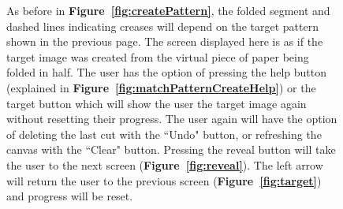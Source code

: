 \documentclass[11pt]{article}
\begin{document}
           \begin{figure}
                \begin{minipage}[c]{0.65\textwidth}
                \caption{As before in \textbf{Figure~\ref{fig:createPattern}}, the folded segment and dashed lines indicating creases will depend on the target pattern shown in the previous page. The screen displayed here is as if the target image was created from the virtual piece of paper being folded in half. The user has the option of pressing the help button (explained in \textbf{Figure~\ref{fig:matchPatternCreateHelp}}) or the target button which will show the user the target image again without resetting their progress. The user again will have the option of deleting the last cut with the ``Undo" button, or refreshing the canvas with the ``Clear" button. Pressing the reveal button will take the user to the next screen (\textbf{Figure~\ref{fig:reveal}}). 
                The left arrow will return the user to the previous screen (\textbf{Figure~\ref{fig:target}}) and progress will be reset.}
                \label{fig:matchPatternCreate}
                \end{minipage}\hfill
                \begin{minipage}[c]{0.35\textwidth}

\end{minipage}
\end{figure}
\end{document}
